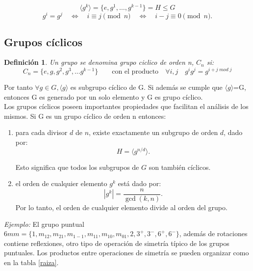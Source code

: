 \documentclass{report}
\newtheorem{definition}{Definición}
\begin{document}
\[
\langle g^k \rangle = \{ e, g^1, \dots, g^{k-1} \} = H \leq G
\]
\[
g^i = g^j \quad \Leftrightarrow \quad i \equiv j \pmod{n} \quad \Leftrightarrow \quad i - j \equiv 0 \pmod{n}.
\]



\subsection{Grupos cíclicos}


\begin{definition}
Un grupo se denomina grupo ciclico de orden n, $C_n$ si:
\[
C_n =\lbrace e,g,g^2,g^3,...g^{k-1} \rbrace  \qquad \text{con el producto} \quad \forall i,j\quad g^i g^j=g^{i+j \; mod \; j}
\]
\end{definition}

Por tanto $\forall g\in G , \langle g\rangle $ es subgrupo cíclico de G. Si además se cumple que $\langle g\rangle$=G, entonces G es generado por un solo elemento y G es grupo cíclico. \\
\vspace{.2cm}
Los grupos cíclicos poseen importantes propiedades que facilitan el análisis de los mismos. Si G es un grupo cíclico de orden n entonces:





\begin{enumerate}
\item 
para cada divisor \( d \) de \( n \), existe exactamente un subgrupo de orden \( d \), dado por:
\[
H = \langle g^{n/d} \rangle.
\]

Esto significa que todos los subgrupos de \( G \) son también cíclicos.

\item  el orden de cualquier elemento \( g^k \) está dado por:
\[
|g^k| = \frac{n}{\gcd(k, n)}.
\]
Por lo tanto, el orden de cualquier elemento divide al orden del grupo.


\end{enumerate}



\vspace{.5cm}








\textit{Ejemplo:} El grupo puntual $6mm=\{1,m_{12},m_{21},m_{1-1},m_{11},m_{10},m_{01},2,3^+,3^-,6^+,6^-\}$, además de rotaciones contiene reflexiones, otro tipo de operación de simetría típico de los grupos puntuales. Los productos entre operaciones de simetría se pueden organizar como en la tabla \ref{raiza}.\\
\end{document}

